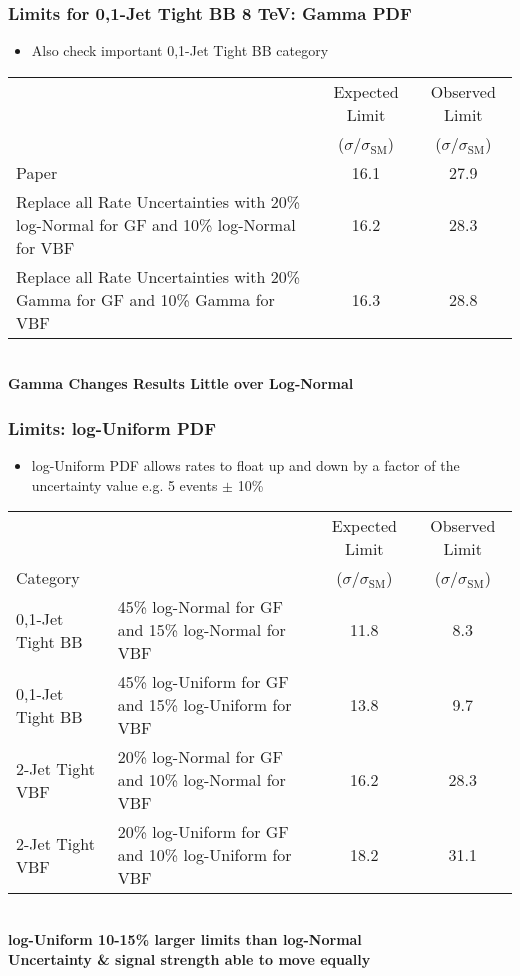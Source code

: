 \documentclass{hugontalk}
\begin{document}
\begin{frame}
\frametitle{Limits for 0,1-Jet Tight BB 8 TeV: Gamma PDF}
\begin{itemize}
  \item Also check important 0,1-Jet Tight BB category
\end{itemize}
\begin{center}
\scriptsize
\begin{tabular}{ | p{5cm} | c | c | }
\hline
 & Expected Limit  & Observed Limit\\
 & ($\sigma/\sigma_\mathrm{SM}$) & ($\sigma/\sigma_\mathrm{SM}$) \\ \hline \hline
Paper & 16.1 & 27.9 \\ \hline
Replace all Rate Uncertainties with 20\% log-Normal for GF and 10\% log-Normal for VBF & 16.2 & 28.3 \\ \hline
Replace all Rate Uncertainties with 20\% Gamma for GF and 10\% Gamma for VBF & 16.3 & 28.8 \\ \hline
\end{tabular}
\\ \normalsize
\vspace{1ex}
\bf Gamma Changes Results Little over Log-Normal
\end{center}
\end{frame}

\begin{frame}
\frametitle{Limits: log-Uniform PDF}
\begin{itemize}
  \item log-Uniform PDF allows rates to float up and down by a factor of the uncertainty value e.g. 5 events $\pm$ 10\%
\end{itemize}
\begin{center}
\scriptsize
\begin{tabular}{ | l | p{4cm} | c | c | }
\hline
& & Expected Limit  & Observed Limit\\
Category & & ($\sigma/\sigma_\mathrm{SM}$) & ($\sigma/\sigma_\mathrm{SM}$) \\ \hline \hline
0,1-Jet Tight BB& 45\% log-Normal for GF and 15\% log-Normal for VBF & 11.8 & 8.3 \\ \hline
0,1-Jet Tight BB& 45\% log-Uniform for GF and 15\% log-Uniform for VBF & 13.8 & 9.7 \\ \hline
\hline
2-Jet Tight VBF& 20\% log-Normal for GF and 10\% log-Normal for VBF & 16.2 & 28.3 \\ \hline
2-Jet Tight VBF& 20\% log-Uniform for GF and 10\% log-Uniform for VBF & 18.2 & 31.1 \\ \hline
\end{tabular}
\\ \normalsize
\vspace{1ex}
\bf log-Uniform 10-15\% larger limits than log-Normal \\
Uncertainty \& signal strength able to move equally
\end{center}
\end{frame}
\end{document}
